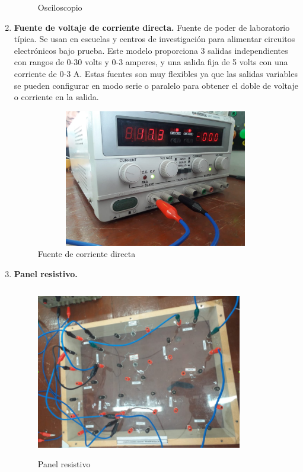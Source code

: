 \documentclass[a4paper,12pt]{report}
\begin{document}
\begin{enumerate}
\begin{figure}[H]
\begin{center}
\caption{Osciloscopio}
\end{center}
\end{figure}
\newpage
\item \textbf{Fuente de voltaje de corriente directa.} Fuente de poder de laboratorio típica. Se usan en escuelas y centros de investigación para alimentar circuitos electrónicos bajo prueba. Este modelo proporciona 3 salidas independientes con rangos de 0-30 volts y 0-3 amperes, y una salida fija de 5 volts con una corriente de 0-3 A. Estas fuentes son muy flexibles ya que las salidas variables se pueden configurar en modo serie o paralelo para obtener el doble de voltaje o corriente en la salida.
\begin{figure}[H]
\begin{center}
\includegraphics[height = 6cm, width =10.5cm]{fuentecd.jpeg}
\caption{Fuente de corriente directa}
\end{center}
\end{figure}
\item \textbf{Panel resistivo.}
\begin{figure}[H]
\begin{center}
\includegraphics[height = 7.5cm, width =9cm, angle=90]{panelresistivo.png}
\caption{Panel resistivo}
\end{center}

\end{figure}
\end{enumerate}
\end{document}

